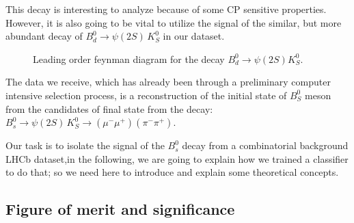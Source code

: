 This decay is interesting to analyze because of some CP sensitive properties. However, it is also going to be vital to utilize the signal of the similar, but more abundant decay of $B_d^0 \rightarrow \psi(2S)\,K_S^0$ in our dataset.

\begin{figure}[H]
    \centering
\caption{Leading order feynman diagram for the decay $B_d^{0} \xrightarrow{} \psi(2S)K^{0}_{S}$.}
\end{figure}
The data we receive, which has already been through a preliminary computer intensive selection process, is a reconstruction of the initial state of $B^{0}_{S}$ meson from the candidates of final state from the decay: $B_s^0 \rightarrow \psi(2S)\,K_S^0 \rightarrow (\mu^-\mu^+) (\pi^-\pi^+)$.

Our task is to isolate the signal of the $B_s^0$ decay from a combinatorial background LHCb dataset,in the following, we are going to explain how we trained a classifier to do that; so we need here to introduce and explain some theoretical concepts.

\subsection{Figure of merit and significance}

